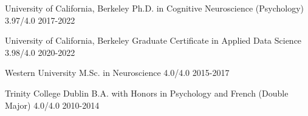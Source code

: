 
\begin{cvhonors}

 \cvhonor
    {University of California, Berkeley} %
    {Ph.D. in Cognitive Neuroscience (Psychology)}
    {3.97/4.0} %
  	{2017-2022}
  	
 \cvhonor
    {University of California, Berkeley} %
    {Graduate Certificate in Applied Data Science}
    {3.98/4.0} %
  	{2020-2022}
  	
 \cvhonor
    {Western University} %
    {M.Sc. in  Neuroscience}
    {4.0/4.0} %
  	{2015-2017}
  	
 \cvhonor
    {Trinity College Dublin} %
    {B.A. with Honors in Psychology and French (Double Major)}
    {4.0/4.0} %
  	{2010-2014}
  	
\end{cvhonors}




